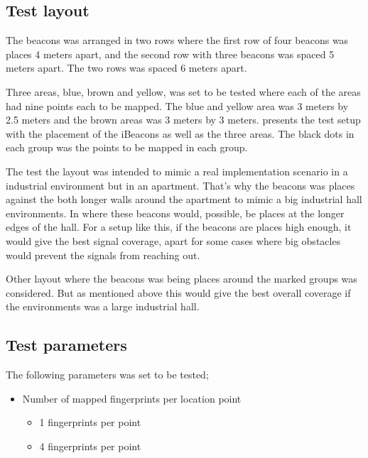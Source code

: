

\subsection{Test layout}\label{sec:methodTestLayout}

The beacons was arranged in two rows where the first row of four beacons was places 4 meters apart, and the second row with three beacons was spaced 5 meters apart.
The two rows was spaced 6 meters apart.

\bigskip

Three areas, blue, brown and yellow, was set to be tested where each of the areas had nine points each to be mapped.
The blue and yellow area was 3 meters by 2.5 meters and the brown areas was 3 meters by 3 meters.
 presents the test setup with the placement of the iBeacons as well as the three areas.
The black dots in each group was the points to be mapped in each group.

\bigskip

The test the layout was intended to mimic a real implementation scenario in a industrial environment but in an apartment.
That's why the beacons was places against the both longer walls around the apartment to mimic a big industrial hall environments.
In where these beacons would, possible, be places at the longer edges of the hall.
For a setup like this, if the beacons are places high enough, it would give the best signal coverage, apart for some cases where big obstacles would prevent the signals from reaching out.

\bigskip

Other layout where the beacons was being places around the marked groups was considered.
But as mentioned above this would give the best overall coverage if the environments was a large industrial hall.


\subsection{Test parameters}\label{sec:methodTestParameters}
The following parameters was set to be tested;

\begin{itemize}
\item Number of mapped fingerprints per location point
	\begin{itemize}
		\item 1 fingerprints per point
		\item 4 fingerprints per point
	\end{itemize}
\end{itemize}

